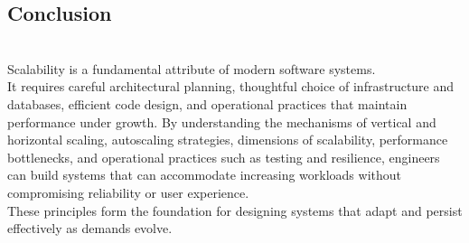 \subsection{Conclusion}\label{U0Vwr8mSCF42aFqalQC00}
\\
Scalability is a fundamental attribute of modern software systems.
\\
It requires careful architectural planning, thoughtful choice of infrastructure and databases, efficient code design, and operational practices that maintain performance under growth. By understanding the mechanisms of vertical and horizontal scaling, autoscaling strategies, dimensions of scalability, performance bottlenecks, and operational practices such as testing and resilience, engineers can build systems that can accommodate increasing workloads without compromising reliability or user experience.
\\
These principles form the foundation for designing systems that adapt and persist effectively as demands evolve.

